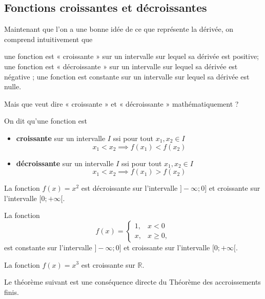 \subsection{Fonctions croissantes et décroissantes}
Maintenant que l'on a une bonne idée de ce que représente la dérivée, on comprend intuitivement que 
\begin{tasks}
\task une fonction est « croissante » sur un intervalle sur lequel sa dérivée est positive;
\task une fonction est « décroissante » sur un intervalle sur lequel sa dérivée est négative ;
\task une fonction est constante sur un intervalle sur lequel sa dérivée est nulle.
\end{tasks}
Mais que veut dire « croissante » et « décroissante » mathématiquement ?
\begin{definition}
	\tcblower
	On dit qu'une fonction est
	\begin{itemize}
		\item {\bfseries croissante} sur un intervalle $I$ ssi pour tout $x_1, x_2\in I$
			\[x_1<x_2\implies f(x_1)<f(x_2)\]

		\item {\bfseries décroissante} sur un intervalle $I$ ssi pour tout $x_1, x_2\in I$
			\[x_1<x_2\implies f(x_1)>f(x_2)\]
	\end{itemize}
\end{definition}
\begin{exemple}
	\tcblower
La fonction $f(x)=x^2$ est décroissante sur l'intervalle $]-\infty;0]$ et croissante sur l'intervalle $[0;+\infty[$. 
\end{exemple}
\begin{exemple}
	\tcblower
	La fonction \[f(x)=\begin{cases}
		1,&x<0\\
		x,&x\geq 0,
	\end{cases}\]
	est constante sur l'intervalle $]-\infty;0]$ et croissante sur l'intervalle $[0;+\infty[$. 
\end{exemple}
\begin{exemple}
	\tcblower
	La fonction $f(x)=x^3$ est croissante sur $\mathbb{R}$.	
\end{exemple}

Le théorème suivant est une conséquence directe du Théorème des accroissements finis.

